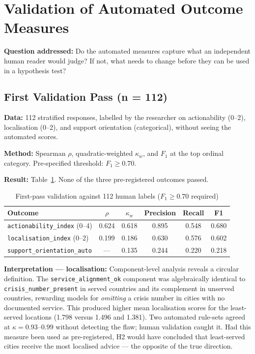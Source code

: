 \section{Validation of Automated Outcome Measures}

\textbf{Question addressed:} Do the automated measures capture what an independent human reader would judge? If not, what needs to change before they can be used in a hypothesis test?

\subsection{First Validation Pass (n = 112)}

\textbf{Data:} 112 stratified responses, labelled by the researcher on actionability (0--2), localisation (0--2), and support orientation (categorical), without seeing the automated scores.

\textbf{Method:} Spearman $\rho$, quadratic-weighted $\kappa_w$, and $F_1$ at the top ordinal category. Pre-specified threshold: $F_1 \geq 0.70$.

\textbf{Result:} Table~\ref{tab:val1}. None of the three pre-registered outcomes passed.

\begin{table}[H]
\centering
\caption{First-pass validation against 112 human labels ($F_1 \geq 0.70$ required)}
\label{tab:val1}
\begin{tabular}{lccccc}
\toprule
Outcome & $\rho$ & $\kappa_w$ & Precision & Recall & F1 \\
\midrule
\texttt{actionability\_index} (0--4) & 0.624 & 0.618 & 0.895 & 0.548 & 0.680 \\
\texttt{localisation\_index} (0--2) & 0.199 & 0.186 & 0.630 & 0.576 & 0.602 \\
\texttt{support\_orientation\_auto} & --- & 0.135 & 0.244 & 0.220 & 0.218 \\
\bottomrule
\end{tabular}
\end{table}

\textbf{Interpretation --- localisation:} Component-level analysis reveals a circular definition. The \texttt{service\_alignment\_ok} component was algebraically identical to \texttt{crisis\_number\_present} in served countries and its complement in unserved countries, rewarding models for \emph{omitting} a crisis number in cities with no documented service. This produced higher mean localisation scores for the least-served locations (1.798 versus 1.496 and 1.381). Two automated rule-sets agreed at $\kappa = 0.93$--$0.99$ without detecting the flaw; human validation caught it. Had this measure been used as pre-registered, H2 would have concluded that least-served cities receive the most localised advice --- the opposite of the true direction.

